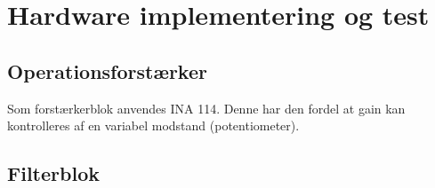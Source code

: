 \chapter{Hardware implementering og test}





\section{Operationsforstærker}
Som forstærkerblok anvendes INA 114. Denne har den fordel at gain kan kontrolleres af en variabel modstand (potentiometer).
\subsection{}
\section{Filterblok}